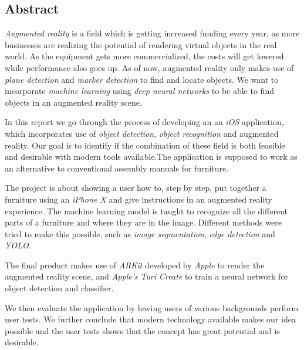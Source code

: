 \begin{center}
\section*{Abstract}
\end{center}
\textit{Augmented reality} is a field which is getting increased funding every year, as more businesses are realizing the potential of rendering virtual objects in the real world. As the equipment gets more commercialized, the costs will get lowered while performance also goes up. As of now, augmented reality only makes use of \textit{plane detection} and \textit{marker detection} to find and locate objects. We want to incorporate \textit{machine learning} using \textit{deep neural networks} to be able to find objects in an augmented reality scene. 

In this report we go through the process of developing an an \textit{iOS} application, which incorporates use of \textit{object detection}, \textit{object recognition} and augmented reality. Our goal is to identify if the combination of these field is both feasible and desirable with modern tools available.The application is supposed to work as an alternative to conventional assembly manuals for furniture. 

The project is about showing a user how to, step by step, put together a furniture using an \textit{iPhone X} and give instructions in an augmented reality experience.
The machine learning model is taught to recognize all the different parts of a furniture and where they are in the image. Different methods were tried to make this possible, such as \textit{image segmentation}, \textit{edge detection} and \textit{YOLO}.

The final product makes use of \textit{ARKit} developed by \textit{Apple} to render the augmented reality scene, and \textit{Apple's} \textit{Turi Create} to train a neural network for object detection and classifier. 

We then evaluate the application by having users of various backgrounds perform user tests. We further conclude that modern technology available makes our idea possible and the user tests shows that the concept has great potential and is desirable.
\newpage